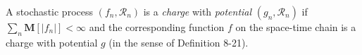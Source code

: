 A stochastic process $(f_n, \mathcal{R}_n)$ is a \emph{charge} with \emph{potential} $(g_n, \mathcal{R}_n)$ if $\sum_n \mathbf{M}[|f_n|] < \infty$ and the corresponding function $f$ on the space-time chain is a charge with potential $g$ (in the sense of Definition 8-21).
